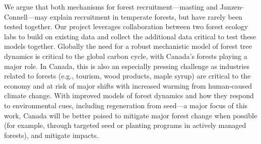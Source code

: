 \documentclass[12pt,oneside]{article}
\begin{document}
We argue that both mechanisms for forest recruitment---masting and Janzen-Connell---may explain recruitment in temperate forests, but have rarely been tested together.\cite{bogdziewicz2024evolutionary} Our project leverages collaboration between two forest ecology labs to build on existing data and collect the additional data critical to test these models together. 
Globally the need for a robust mechanistic model of forest tree dynamics is critical to the global carbon cycle, with Canada's forests playing a major role.\cite{ipcc2021,friedlingstein2022global} In Canada, this is also an especially pressing challenge as industries related to forests (e.g., tourism, wood products, maple syrup) are critical to the economy and at risk of major shifts with increased warming from human-caused climate change. With improved models of forest dynamics and how they respond to environmental cues, including regeneration from seed---a major focus of this work, Canada will be better poised to mitigate major forest change when possible (for example, through targeted seed or planting programs in actively managed forests), and mitigate impacts. 

\end{document}
